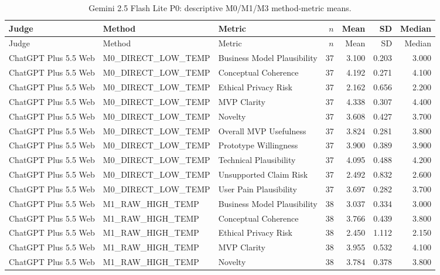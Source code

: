 \documentclass[10pt]{article}
\begin{document}
\begin{landscape}
\small
\begin{longtable}{lllrrrr}
\caption{Gemini 2.5 Flash Lite P0: descriptive M0/M1/M3 method-metric means.}\label{tab:s16-method25p0}\\
\toprule Judge & Method & Metric & $n$ & Mean & SD & Median \\ \midrule\endfirsthead
\toprule Judge & Method & Metric & $n$ & Mean & SD & Median \\ \midrule\endhead
\bottomrule\endfoot
ChatGPT Plus 5.5 Web & M0\_DIRECT\_LOW\_TEMP & Business Model Plausibility & 37 & 3.100 & 0.203 & 3.000 \\
ChatGPT Plus 5.5 Web & M0\_DIRECT\_LOW\_TEMP & Conceptual Coherence & 37 & 4.192 & 0.271 & 4.100 \\
ChatGPT Plus 5.5 Web & M0\_DIRECT\_LOW\_TEMP & Ethical Privacy Risk & 37 & 2.162 & 0.656 & 2.200 \\
ChatGPT Plus 5.5 Web & M0\_DIRECT\_LOW\_TEMP & MVP Clarity & 37 & 4.338 & 0.307 & 4.400 \\
ChatGPT Plus 5.5 Web & M0\_DIRECT\_LOW\_TEMP & Novelty & 37 & 3.608 & 0.427 & 3.700 \\
ChatGPT Plus 5.5 Web & M0\_DIRECT\_LOW\_TEMP & Overall MVP Usefulness & 37 & 3.824 & 0.281 & 3.800 \\
ChatGPT Plus 5.5 Web & M0\_DIRECT\_LOW\_TEMP & Prototype Willingness & 37 & 3.900 & 0.389 & 3.900 \\
ChatGPT Plus 5.5 Web & M0\_DIRECT\_LOW\_TEMP & Technical Plausibility & 37 & 4.095 & 0.488 & 4.200 \\
ChatGPT Plus 5.5 Web & M0\_DIRECT\_LOW\_TEMP & Unsupported Claim Risk & 37 & 2.492 & 0.832 & 2.600 \\
ChatGPT Plus 5.5 Web & M0\_DIRECT\_LOW\_TEMP & User Pain Plausibility & 37 & 3.697 & 0.282 & 3.700 \\
ChatGPT Plus 5.5 Web & M1\_RAW\_HIGH\_TEMP & Business Model Plausibility & 38 & 3.037 & 0.334 & 3.000 \\
ChatGPT Plus 5.5 Web & M1\_RAW\_HIGH\_TEMP & Conceptual Coherence & 38 & 3.766 & 0.439 & 3.800 \\
ChatGPT Plus 5.5 Web & M1\_RAW\_HIGH\_TEMP & Ethical Privacy Risk & 38 & 2.450 & 1.112 & 2.150 \\
ChatGPT Plus 5.5 Web & M1\_RAW\_HIGH\_TEMP & MVP Clarity & 38 & 3.955 & 0.532 & 4.100 \\
ChatGPT Plus 5.5 Web & M1\_RAW\_HIGH\_TEMP & Novelty & 38 & 3.784 & 0.378 & 3.800 \\

\end{longtable}
\end{landscape}
\end{document}
